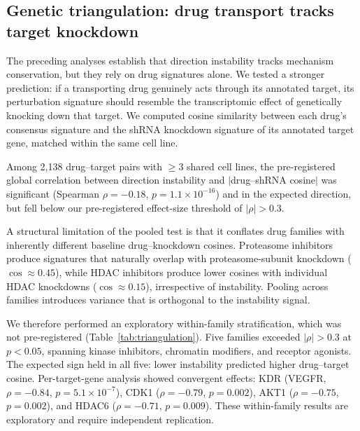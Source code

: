 \documentclass{article}
\begin{document}
\subsection{Genetic triangulation: drug transport tracks target knockdown}
\label{sec:genetic}

The preceding analyses establish that direction instability tracks
mechanism conservation, but they rely on drug signatures alone. We tested
a stronger prediction: if a transporting drug genuinely acts through its
annotated target, its perturbation signature should resemble the
transcriptomic effect of genetically knocking down that target. We computed
cosine similarity between each drug's consensus signature and the shRNA
knockdown signature of its annotated target gene, matched within the same
cell line.

Among 2{,}138 drug--target pairs with $\geq3$ shared cell lines, the
pre-registered global correlation between direction instability and
$|$drug--shRNA cosine$|$ was significant (Spearman $\rho = -0.18$,
$p = 1.1 \times 10^{-16}$) and in the expected direction, but fell below
our pre-registered effect-size threshold of $|\rho| > 0.3$.

A structural limitation of the pooled test is that it conflates drug
families with inherently different baseline drug--knockdown cosines.
Proteasome inhibitors produce signatures that naturally overlap with
proteasome-subunit knockdown ($\cos \approx 0.45$), while HDAC
inhibitors produce lower cosines with individual HDAC knockdowns
($\cos \approx 0.15$), irrespective of instability. Pooling across
families introduces variance that is orthogonal to the instability
signal.

We therefore performed an exploratory within-family stratification,
which was not pre-registered (Table~\ref{tab:triangulation}). Five
families exceeded $|\rho| > 0.3$ at $p < 0.05$, spanning kinase
inhibitors, chromatin modifiers, and receptor agonists. The expected
sign held in all five: lower instability predicted higher drug--target
cosine. Per-target-gene analysis showed convergent effects:
KDR (VEGFR, $\rho = -0.84$, $p = 5.1 \times 10^{-7}$), CDK1
($\rho = -0.79$, $p = 0.002$), AKT1 ($\rho = -0.75$, $p = 0.002$),
and HDAC6 ($\rho = -0.71$, $p = 0.009$). These within-family results
are exploratory and require independent replication.
\end{document}
